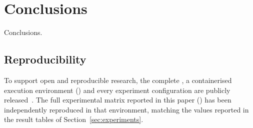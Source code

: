 \section{Conclusions}\label{sec:conclusions}
Conclusions.

\subsection{Reproducibility}
To support open and reproducible research, the complete , a containerised execution environment () and every experiment configuration are publicly released~. The full experimental matrix reported in this paper () has been independently reproduced in that environment, matching the values reported in the result tables of Section~\ref{sec:experiments}.
